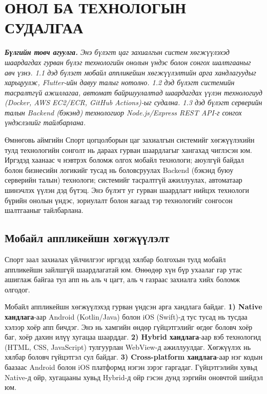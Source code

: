 
\chapter{ОНОЛ БА ТЕХНОЛОГЫН СУДАЛГАА}
\label{Chapter2}
\pagecolor{white}

\noindent\textit{\textbf{Бүлгийн товч агуулга.} Энэ бүлэгт цаг захиалгын систем хөгжүүлэхэд шаардагдах гурван бүлэг технологийн онолын үндэс болон сонгох шалтгааныг авч үзнэ. 1.1 дэд бүлэгт мобайл аппликейшн хөгжүүлэлтийн арга хандлагуудыг харьцуулж, Flutter-ийн давуу талыг нотолно. 1.2 дэд бүлэгт системийн тасралтгүй ажиллагаа, автомат байршуулалтад шаардагдах үүлэн технологиуд (Docker, AWS EC2/ECR, GitHub Actions)-ыг судална. 1.3 дэд бүлэгт серверийн талын Backend (бэкэнд) технологиор Node.js/Express REST API-г сонгох үндэслэлийг тайлбарлана.}

\bigskip

Өмнөговь аймгийн Спорт цогцолборын цаг захиалгын системийг хөгжүүлэхийн тулд технологийн сонголт нь дараах гурван шаардлагыг хангахад чиглэсэн юм. Иргэдэд хаанаас ч нэвтрэх боломж олгох мобайл технологи; аюулгүй байдал болон бизнесийн логикийг тусад нь боловсруулах Backend (бэкэнд буюу серверийн талын) технологи; системийг тасралтгүй ажиллуулах, автоматаар шинэчлэх үүлэн дэд бүтэц. Энэ бүлэгт уг гурван шаардлагт нийцэх технологи бүрийн онолын үндэс, зориулалт болон яагаад тэр технологийг сонгосон шалтгааныг тайлбарлана.


\section{Мобайл аппликейшн хөгжүүлэлт}

Спорт заал захиалах үйлчилгээг иргэдэд хялбар болгохын тулд мобайл аппликейшн зайлшгүй шаардлагатай юм. Өнөөдөр хүн бүр ухаалаг гар утас ашиглаж байгаа тул апп нь аль ч цагт, аль ч газраас захиалга хийх боломж олгодог.

Мобайл аппликейшн хөгжүүлэхэд гурван үндсэн арга хандлага байдаг. \textbf{1) Native хандлага}-аар Android (Kotlin/Java) болон iOS (Swift)-д тус тусад нь тусдаа хэлээр хоёр апп бичдэг. Энэ нь хамгийн өндөр гүйцэтгэлийг өгдөг боловч хоёр баг, хоёр дахин илүү хугацаа шаарддаг. \textbf{2) Hybrid хандлага}-аар вэб технологид (HTML, CSS, JavaScript) тулгуурлан WebView-д ажиллуулдаг. Хөгжүүлэх нь хялбар боловч гүйцэтгэл сул байдаг. \textbf{3) Cross-platform хандлага}-аар нэг кодын баазаас Android болон iOS платформд нэгэн зэрэг гаргадаг. Гүйцэтгэлийн хувьд Native-д ойр, хугацааны хувьд Hybrid-д ойр гэсэн дунд зэргийн оновчтой шийдэл юм.

